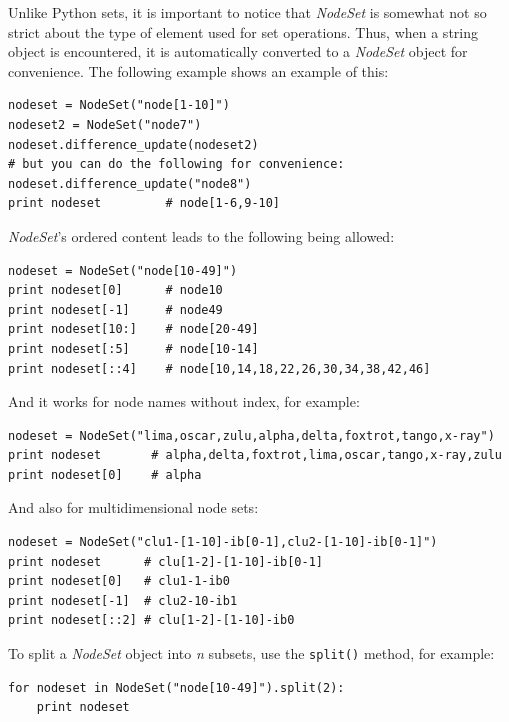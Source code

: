 \documentclass[english,a4paper]{csuserguide}
\newcommand{\NodeSet}{\textit{NodeSet}\xspace}
\begin{document}
Unlike Python sets, it is important to notice that \NodeSet is somewhat not so strict about the type of element used for set operations. Thus, when a string object is encountered, it is automatically converted to a \NodeSet object for convenience. The following example shows an example of this:
\medskip
\begin{lstlisting}[breaklines=true, breakatwhitespace=true]
nodeset = NodeSet("node[1-10]")
nodeset2 = NodeSet("node7")
nodeset.difference_update(nodeset2)
# but you can do the following for convenience:
nodeset.difference_update("node8")
print nodeset         # node[1-6,9-10]
\end{lstlisting}

\medskip

\NodeSet's ordered content leads to the following being allowed:

\medskip
\begin{lstlisting}[breaklines=true, breakatwhitespace=true]
nodeset = NodeSet("node[10-49]")
print nodeset[0]      # node10
print nodeset[-1]     # node49
print nodeset[10:]    # node[20-49]
print nodeset[:5]     # node[10-14]
print nodeset[::4]    # node[10,14,18,22,26,30,34,38,42,46]
\end{lstlisting}

And it works for node names without index, for example:
\medskip
\begin{lstlisting}[breaklines=true, breakatwhitespace=true]
nodeset = NodeSet("lima,oscar,zulu,alpha,delta,foxtrot,tango,x-ray")
print nodeset       # alpha,delta,foxtrot,lima,oscar,tango,x-ray,zulu
print nodeset[0]    # alpha
\end{lstlisting}

And also for multidimensional node sets:

\medskip
\begin{lstlisting}[breaklines=true, breakatwhitespace=true]
nodeset = NodeSet("clu1-[1-10]-ib[0-1],clu2-[1-10]-ib[0-1]")
print nodeset      # clu[1-2]-[1-10]-ib[0-1]
print nodeset[0]   # clu1-1-ib0
print nodeset[-1]  # clu2-10-ib1
print nodeset[::2] # clu[1-2]-[1-10]-ib0
\end{lstlisting}


\medskip
\label{class-NodeSet-split}

To split a \NodeSet object into \textit{n} subsets, use the \lstinline+split()+ method, for example:
\medskip
\begin{lstlisting}[breaklines=true, breakatwhitespace=true]
for nodeset in NodeSet("node[10-49]").split(2):
    print nodeset
\end{lstlisting}
\end{document}
